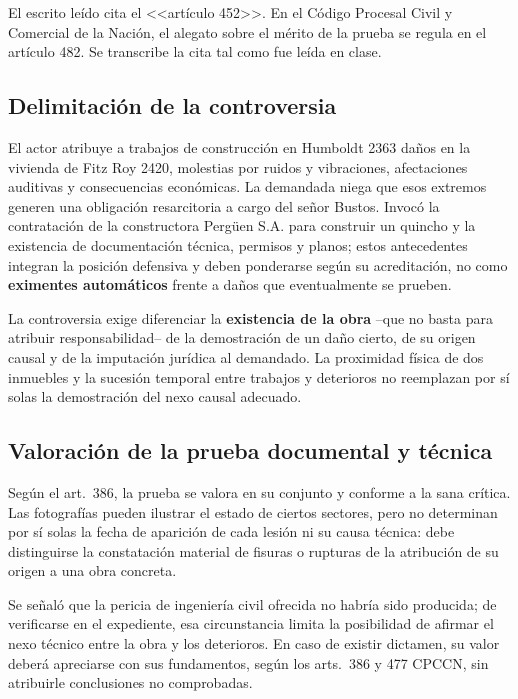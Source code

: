 \documentclass[12pt,oneside]{book}
\begin{document}
\begin{note}
El escrito le\'ido cita el <<art\'iculo 452>>. En el C\'odigo Procesal Civil y Comercial de la Naci\'on, el alegato sobre el m\'erito de la prueba se regula en el art\'iculo 482. Se transcribe la cita tal como fue le\'ida en clase.
\end{note}

\subsection{Delimitaci\'on de la controversia}

El actor atribuye a trabajos de construcci\'on en Humboldt 2363 da\~nos en la vivienda de Fitz Roy 2420, molestias por ruidos y vibraciones, afectaciones auditivas y consecuencias econ\'omicas. La demandada niega que esos extremos generen una obligaci\'on resarcitoria a cargo del se\~nor Bustos. Invoc\'o la contrataci\'on de la constructora Perg\"uen S.A. para construir un quincho y la existencia de documentaci\'on t\'ecnica, permisos y planos; estos antecedentes integran la posici\'on defensiva y deben ponderarse seg\'un su acreditaci\'on, no como \textbf{eximentes autom\'aticos} frente a da\~nos que eventualmente se prueben.

La controversia exige diferenciar la \textbf{existencia de la obra} --que no basta para atribuir responsabilidad-- de la demostraci\'on de un da\~no cierto, de su origen causal y de la imputaci\'on jur\'idica al demandado. La proximidad f\'isica de dos inmuebles y la sucesi\'on temporal entre trabajos y deterioros no reemplazan por s\'i solas la demostraci\'on del nexo causal adecuado.

\subsection{Valoraci\'on de la prueba documental y t\'ecnica}

Seg\'un el art.~386, la prueba se valora en su conjunto y conforme a la sana cr\'itica. Las fotograf\'ias pueden ilustrar el estado de ciertos sectores, pero no determinan por s\'i solas la fecha de aparici\'on de cada lesi\'on ni su causa t\'ecnica: debe distinguirse la constataci\'on material de fisuras o rupturas de la atribuci\'on de su origen a una obra concreta.

Se se\~nal\'o que la pericia de ingenier\'ia civil ofrecida no habr\'ia sido producida; de verificarse en el expediente, esa circunstancia limita la posibilidad de afirmar el nexo t\'ecnico entre la obra y los deterioros. En caso de existir dictamen, su valor deber\'a apreciarse con sus fundamentos, seg\'un los arts.~386 y 477 CPCCN, sin atribuirle conclusiones no comprobadas.
\end{document}
